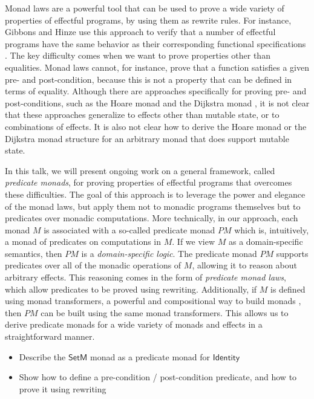 \documentclass[preprint]{sigplanconf}
\begin{document}
Monad laws are a powerful tool that can be used to prove a wide variety of
properties of effectful programs, by using them as rewrite rules. For instance,
Gibbons and Hinze use this approach to verify that a number of effectful
programs have the same behavior as their corresponding functional specifications
\cite{gibbons11}.
%
The key difficulty comes when we want to prove properties other than equalities.
Monad laws cannot, for instance, prove that a function satisfies a given pre-
and post-condition, because this is not a property that can be defined in terms
of equality. Although there are approaches specifically for proving pre- and
post-conditions, such as the Hoare monad \cite{nanevski08} and the Dijkstra
monad \cite{swamy13}, it is not clear that these approaches generalize to
effects other than mutable state, or to combinations of effects.
It is also not clear how to derive the Hoare monad or the Dijkstra monad
structure for an arbitrary monad that does support mutable state.


In this talk, we will present ongoing work on a general framework, called
\emph{predicate monads}, for proving properties of effectful programs that
overcomes these difficulties. The goal of this approach is to leverage the power
and elegance of the monad laws, but apply them not to monadic programs
themselves but to predicates over monadic computations.  More technically, in
our approach, each monad $M$ is associated with a so-called predicate monad $PM$
which is, intuitively, a monad of predicates on computations in $M$.
If we view $M$ as a domain-specific semantics, then $PM$ is a
\emph{domain-specific logic}.
The predicate monad $PM$ supports predicates over all of the monadic operations
of $M$, allowing it to reason about arbitrary effects. This reasoning comes in
the form of \emph{predicate monad laws}, which allow predicates to be proved
using rewriting. Additionally, if $M$ is defined using monad transformers, a
powerful and compositional way to build monads \cite{liang95}, then $PM$ can be
built using the same monad transformers. This allows us to derive predicate
monads for a wide variety of monads and effects in a straightforward manner.


\begin{itemize}
\item Describe the $\mathsf{SetM}$ monad as a predicate monad for
  $\mathsf{Identity}$
\item Show how to define a pre-condition / post-condition predicate, and
  how to prove it using rewriting
\end{itemize}




\end{document}
